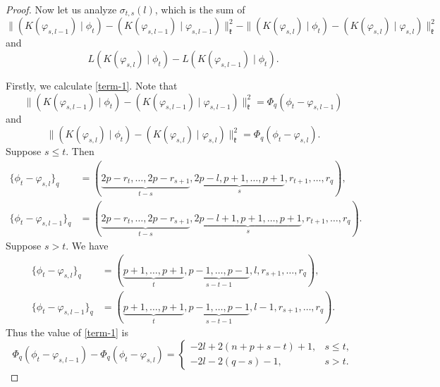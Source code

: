 \documentclass[10pt,a4paper]{amsart}
\newcommand{\frk}{\mathfrak{k}}
\begin{document}
\begin{proof}
Now let us analyze $\sigma_{t,s}(l)$, which is the sum of
\begin{equation}\label{term-1}
\|(K(\varphi_{s, l-1})\mid\phi_t) - (K(\varphi_{s, l-1})\mid\varphi_{s, l-1})\|_{\frk}^2 - \|(K(\varphi_{s, l})\mid\phi_t) - (K(\varphi_{s, l})\mid\varphi_{s, l})\|_{\frk}^2
\end{equation}
and
\begin{equation}\label{term-2}
L(K(\varphi_{s, l})\mid\phi_t)- L(K(\varphi_{s, l-1})\mid\phi_t).
\end{equation}

Firstly, we calculate \eqref{term-1}. Note that
\[\|(K(\varphi_{s, l-1})\mid\phi_t) - (K(\varphi_{s, l-1})\mid\varphi_{s, l-1})\|_{\frk}^2=\Phi_q(\phi_t-\varphi_{s,{l-1}})\]
and
\[\|(K(\varphi_{s, l})\mid\phi_t) - (K(\varphi_{s, l})\mid\varphi_{s, l})\|_{\frk}^2=\Phi_q(\phi_t-\varphi_{s,l}).\]
 Suppose $s\le t$. Then
\begin{align*}
	\{\phi_t-\varphi_{s,l}\}_q&=(\underbrace{2p-r_t,\dots,2p-r_{s+1}}_{t-s},\underbrace{2p-l,p+1,\dots,p+1}_{s},r_{t+1},\dots,r_q),\\
	\{\phi_t-\varphi_{s,l-1}\}_q&=(\underbrace{2p-r_t,\dots,2p-r_{s+1}}_{t-s},\underbrace{2p-l+1,p+1,\dots,p+1}_{s},r_{t+1},\dots,r_q).
\end{align*}
Suppose $s>t$. We have
\begin{align*}
	\{\phi_t-\varphi_{s,l}\}_q&=(\underbrace{p+1,\dots,p+1}_{t},\underbrace{p-1,\dots,p-1}_{s-t-1},l,r_{s+1},\dots,r_q),\\
	\{\phi_t-\varphi_{s,l-1}\}_q&=(\underbrace{p+1,\dots,p+1}_{t},\underbrace{p-1,\dots,p-1}_{s-t-1},l-1,r_{s+1},\dots,r_q).
\end{align*}
Thus the value of \eqref{term-1} is
\begin{equation}\label{term-1-1}
\Phi_q(\phi_t-\varphi_{s,{l-1}})-\Phi_q(\phi_t-\varphi_{s,l})=\left\{
\begin{array}{ll}
	-2l+2(n+p+s-t)+1, & s\le t,\\
	-2l-2(q-s)-1,& s>t.
\end{array}
\right.
\end{equation}



\end{proof}
\end{document}
